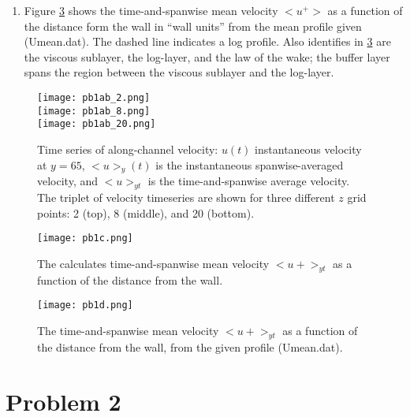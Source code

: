 \documentclass[11pt]{article}
\begin{document}
\begin{enumerate}[label=(\alph*)]
      \item Figure \ref{fig:the_mean_velocity2} shows the time-and-spanwise mean velocity $<u^+>$ as  a function
          of the distance form the wall in ``wall units'' from the mean profile given (Umean.dat). The dashed line indicates a log profile. Also identifies in  \ref{fig:the_mean_velocity2} are the viscous sublayer, the log-layer, and the
          law of the wake; the buffer layer spans the region between the viscous sublayer and the log-layer.



\end{enumerate}

\begin{figure}[ht]
\begin{center}
\texttt{[image: pb1ab\_2.png]}\\
\texttt{[image: pb1ab\_8.png]}\\
\texttt{[image: pb1ab\_20.png]}
\end{center}
\caption{Time series of along-channel velocity: $u(t)$ instantaneous velocity at $y=65$, $<u>_y(t)$ is the 
instantaneous spanwise-averaged velocity, and $<u>_{yt}$ is the time-and-spanwise average velocity. The triplet
 of velocity timeseries are shown for three different $z$ grid points: 2 (top), 8 (middle), and 20 (bottom).}
\label{fig:the_velocity}
\end{figure}

\begin{figure}[ht]
\begin{center}
\texttt{[image: pb1c.png]}\\
\end{center}
\caption{The calculates time-and-spanwise mean velocity $<u+>_{yt}$ as a function of the distance from the wall.}
\label{fig:the_mean_velocity}
\end{figure}

\begin{figure}[ht]
\begin{center}
\texttt{[image: pb1d.png]}\\
\end{center}
\caption{The time-and-spanwise mean velocity $<u+>_{yt}$ as a function of the distance from the wall, from the given profile (Umean.dat).}
\label{fig:the_mean_velocity2}
\end{figure}


\section*{Problem 2}
\end{document}
